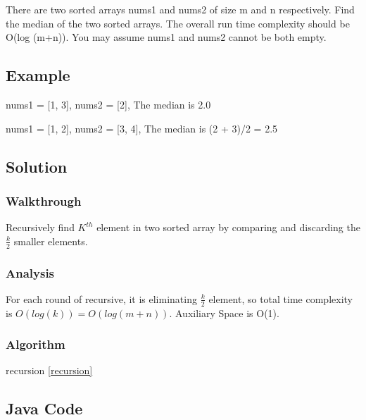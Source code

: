 \documentclass[]{book}
\begin{document}
There are two sorted arrays nums1 and nums2 of size m and n respectively. Find the median of the two sorted
arrays. The overall run time complexity should be O(log (m+n)). You may assume nums1 and nums2 cannot be both
empty.

\hypertarget{example-11}{%
\subsection{Example}\label{example-11}}

nums1 = {[}1, 3{]}, nums2 = {[}2{]}, The median is 2.0

nums1 = {[}1, 2{]}, nums2 = {[}3, 4{]}, The median is (2 + 3)/2 = 2.5

\hypertarget{solution-9}{%
\subsection{Solution}\label{solution-9}}

\hypertarget{walkthrough-11}{%
\subsubsection{Walkthrough}\label{walkthrough-11}}

Recursively find \(K^{th}\) element in two sorted array by comparing and discarding the \(\frac{k}{2}\) smaller
elements.

\hypertarget{analysis-13}{%
\subsubsection{Analysis}\label{analysis-13}}

For each round of recursive, it is eliminating \(\frac{k}{2}\) element, so total time complexity is
\(O(log(k)) = O(log(m + n))\). Auxiliary Space is O(1).

\hypertarget{algorithm-13}{%
\subsubsection{Algorithm}\label{algorithm-13}}

recursion \ref{recursion}

\hypertarget{java-code-11}{%
\subsection{Java Code}\label{java-code-11}}
\end{document}
